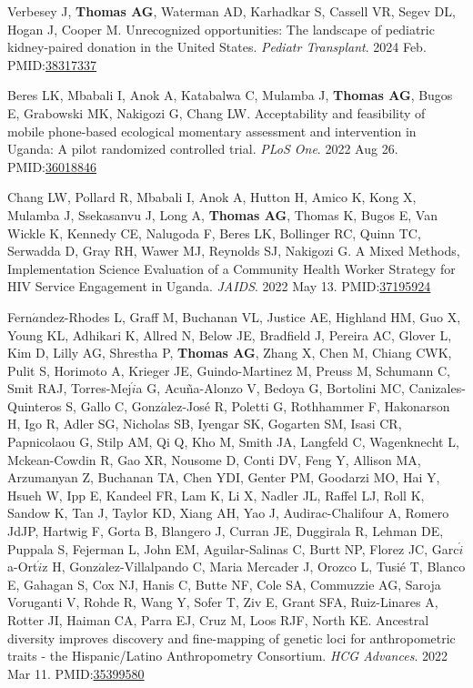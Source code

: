 \documentclass[10pt]{article}
\makeatletter
\newlength{\bibhang}
\newlength{\bibsep}
 {\@listi \global\bibsep\itemsep \global\advance\bibsep by\parsep}
\newenvironment{bibenum*}
  {\renewcommand\labelenumi{[\theenumi]}%
   \etaremune[
     topsep=0pt,
     itemsep=\bibsep,
     parsep=0pt,partopsep=0pt,
     itemindent=-\bibhang,
     leftmargin={\bibhang+\widthof{[999]}}]}
  {\endetaremune}
\newcommand{\pmid}[1]{PMID:\href{https://www.ncbi.nlm.nih.gov/pubmed/#1}{#1}}
\makeatother
\begin{document}
\begin{bibenum*}
\item Verbesey J, \textbf{Thomas AG}, Waterman AD, Karhadkar S, Cassell VR, 
  Segev DL, Hogan J, Cooper M. Unrecognized opportunities: 
  The landscape of pediatric kidney-paired donation in the United States. 
  \emph{Pediatr Transplant}. 2024 Feb.
  \pmid{38317337} 

\item Beres LK, Mbabali I, Anok A, Katabalwa C, Mulamba J, \textbf{Thomas AG}, 
  Bugos E, Grabowski MK, Nakigozi G, Chang LW.
  Acceptability and feasibility of mobile phone-based ecological momentary 
  assessment and intervention in Uganda: A pilot randomized controlled trial.
  \emph{PLoS One}. 2022 Aug 26.
  \pmid{36018846} 

\item Chang LW, Pollard R, Mbabali I, Anok A, Hutton H, 
  Amico K, Kong X, Mulamba J, Ssekasanvu J, Long A, 
  \textbf{Thomas AG}, Thomas K, Bugos E, Van Wickle K, 
  Kennedy CE, Nalugoda F, Beres LK, Bollinger RC, Quinn TC, 
  Serwadda D, Gray RH, Wawer MJ, Reynolds SJ, Nakigozi G.
  A Mixed Methods, Implementation Science Evaluation of a Community 
  Health Worker Strategy for HIV Service Engagement in Uganda.
  \emph{JAIDS}. 2022 May 13.
  \pmid{37195924} 
  
\item Fern$\acute{a}$ndez-Rhodes L, Graff M, Buchanan VL, 
  Justice AE, Highland HM, Guo X, Young KL, Adhikari K,
  Allred N, Below JE, Bradfield J, Pereira AC, Glover L,
  Kim D, Lilly AG, Shrestha P, \textbf{Thomas AG}, Zhang X,
  Chen M, Chiang CWK, Pulit S, Horimoto A, Krieger JE, Guindo-Martinez M,
  Preuss M, Schumann C, Smit RAJ, Torres-Mej$\acute{i}$a G, 
  Acuña-Alonzo V, Bedoya G, Bortolini MC, 
  Canizales-Quinteros S, Gallo C, Gonz$\acute{a}$lez-José R, 
  Poletti G, Rothhammer F, Hakonarson H, Igo R, Adler SG, 
  Nicholas SB, Iyengar SK, Gogarten SM, Isasi CR, 
  Papnicolaou G, Stilp AM, Qi Q, Kho M, Smith JA, 
  Langfeld C, Wagenknecht L, Mckean-Cowdin R, Gao XR, 
  Nousome D, Conti DV, Feng Y, Allison MA, Arzumanyan Z, 
  Buchanan TA, Chen YDI, Genter PM, Goodarzi MO, Hai Y, 
  Hsueh W, Ipp E, Kandeel FR, Lam K, Li X, Nadler JL, 
  Raffel LJ, Roll K, Sandow K, Tan J, Taylor KD, Xiang AH, 
  Yao J, Audirac-Chalifour A, Romero JdJP, Hartwig F, 
  Gorta B, Blangero J, Curran JE, Duggirala R, Lehman DE, 
  Puppala S, Fejerman L, John EM, Aguilar-Salinas C, 
  Burtt NP, Florez JC, Garc$\acute{i}$a-Ort$\acute{i}$z H, 
  Gonz$\acute{a}$lez-Villalpando C, 
  Maria Mercader J, Orozco L, Tusié T, Blanco E, Gahagan S, 
  Cox NJ, Hanis C, Butte NF, Cole SA, Commuzzie AG, 
  Saroja Voruganti V, Rohde R, Wang Y, Sofer T, Ziv E, 
  Grant SFA, Ruiz-Linares A, Rotter JI, Haiman CA, 
  Parra EJ, Cruz M, Loos RJF, North KE.
  Ancestral diversity improves discovery and 
  fine-mapping of genetic loci 
  for anthropometric traits - 
  the Hispanic/Latino Anthropometry Consortium.
  \emph{HCG Advances}. 2022 Mar 11.
  \pmid{35399580} 


\end{bibenum*}
\end{document}
